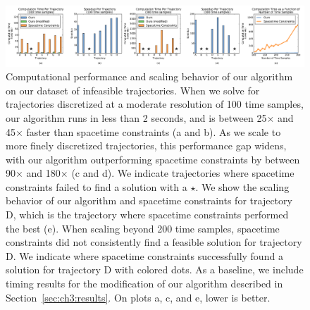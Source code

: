 \begin{figure}[t]
\centering
\includegraphics[width=6.0in]{images/2016_siggraph/00_computational_performance.pdf}
\caption{
Computational performance and scaling behavior of our algorithm on our dataset of infeasible trajectories.
When we solve for trajectories discretized at a moderate resolution of 100 time samples, our algorithm runs in less than 2 seconds, and is between 25$\times$ and 45$\times$ faster than spacetime constraints (a and b).
As we scale to more finely discretized trajectories, this performance gap widens, with our algorithm outperforming spacetime constraints by between 90$\times$ and 180$\times$ (c and d).
We indicate trajectories where spacetime constraints failed to find a solution with a $\star$.
We show the scaling behavior of our algorithm and spacetime constraints for trajectory \textsc{D}, which is the trajectory where spacetime constraints performed the best (e).
When scaling beyond 200 time samples, spacetime constraints did not consistently find a feasible solution for trajectory \textsc{D}.
We indicate where spacetime constraints successfully found a solution for trajectory \textsc{D} with colored dots.
As a baseline, we include timing results for the modification of our algorithm described in Section~\ref{sec:ch3:results}.
On plots a, c, and e, lower is better.
}
\label{fig:ch3:computation}
\end{figure}

